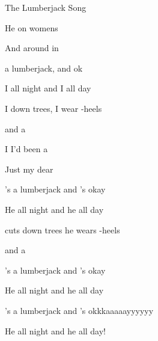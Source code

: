 \begin{SBSong}{The Lumberjack Song}
\begin{SBVerse}
    He  on womens 
    
    And  around in 
  \end{SBVerse}
  \begin{SBVerse}
     a lumberjack, and  ok
    
    I  all night and I  all day
    
    I  down trees, I wear -heels
    
     and a 
    
    I  I'd been a 
    
    Just  my dear 
  \end{SBVerse}
  \begin{SBVerse}
    's a lumberjack and 's okay
    
    He  all night and he  all day
    
     cuts down trees he wears -heels
    
     and a 
  \end{SBVerse}
  \begin{SBVerse}
    's a lumberjack and 's okay
    
    He  all night and he  all day
    
    's a lumberjack and 's okkkaaaaayyyyyy
    
    He  all night and he  all day!
  \end{SBVerse}
\end{SBSong}